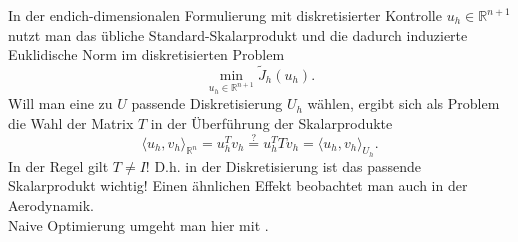 \documentclass[main.tex]{subfiles}
\begin{document}
\begin{bsp}
In der endich-dimensionalen Formulierung mit diskretisierter Kontrolle $u_h \in ℝ^{n+1}$ nutzt man das übliche Standard-Skalarprodukt und die dadurch induzierte Euklidische Norm im diskretisierten Problem
$$\min_{u_h\in ℝ^{n+1} }\tilde J_h (u_h).$$
Will man eine zu $U$ passende Diskretisierung $U_h$ wählen, ergibt sich als Problem die Wahl der Matrix $T$ in der Überführung der Skalarprodukte
$$\langle u_h, v_h \rangle_{ℝ^n} = u_h^T v_h \stackrel{?}= u_h^T T v_h = \langle u_h, v_h \rangle_{U_h}.$$
In der Regel gilt $T\ne I$! D.h. in der Diskretisierung ist das passende Skalarprodukt wichtig! Einen ähnlichen Effekt beobachtet man auch in der Aerodynamik. \\
Naive Optimierung umgeht man hier mit .
\end{bsp}
\end{document}
